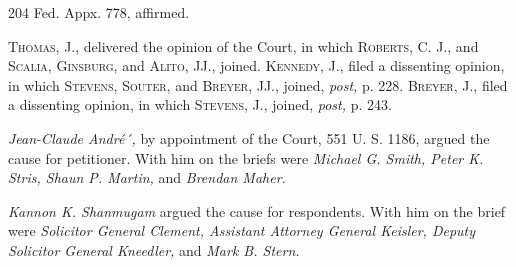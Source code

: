 204 Fed. Appx. 778, affirmed.

  \textsc{Thomas,} J., delivered the opinion of the Court, in which \textsc{Roberts,} C. J., and \textsc{Scalia, Ginsburg,} and \textsc{Alito,} JJ., joined. \textsc{Kennedy, J.,} filed a dissenting opinion, in which \textsc{Stevens, Souter,} and \textsc{Breyer, JJ.,} joined, \emph{post,} p. 228. \textsc{Breyer,} J., filed a dissenting opinion, in which \textsc{Stevens,} J., joined, \emph{post,} p. 243.

  \emph{Jean-Claude André´,} by appointment of the Court, 551 U. S. 1186, argued the cause for petitioner. With him on the briefs were \emph{Michael G. Smith, Peter K. Stris, Shaun P. Martin,} and \emph{Brendan Maher.}

  \emph{Kannon K. Shanmugam} argued the cause for respondents. With him on the brief were \emph{Solicitor General Clement, Assistant Attorney General
Keisler, Deputy Solicitor General Kneedler,} and \emph{Mark B. Stern.}
